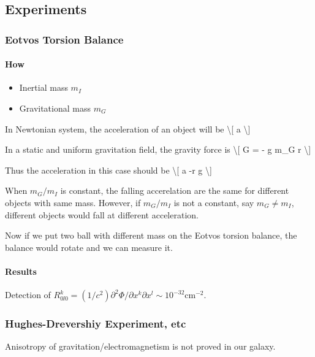 \documentclass[letterpaper,10pt,english]{sphinxmanual}
\begin{document}
\subsection{Experiments}
\label{relativity/GeneralRelativityAdv:experiments}

\subsubsection{Eotvos Torsion Balance}
\label{relativity/GeneralRelativityAdv:eotvos-torsion-balance}

\paragraph{How}
\label{relativity/GeneralRelativityAdv:how}\begin{itemize}
\item {} 
Inertial mass $m_I$

\item {} 
Gravitational mass $m_G$

\end{itemize}

In Newtonian system, the acceleration of an object will be \textbackslash{}{[} a \textbackslash{}{]}

In a static and uniform gravitation field, the gravity force is \textbackslash{}{[} G =
- g m\_G r \textbackslash{}{]}

Thus the acceleration in this case should be \textbackslash{}{[} a -r g \textbackslash{}{]}

When $m_G/m_I$ is constant, the falling accerelation are the same
for different objects with same mass. However, if $m_G/m_I$ is not
a constant, say $m_G\ne m_I$, different objects would fall at
different acceleration.

Now if we put two ball with different mass on the Eotvos torsion
balance, the balance would rotate and we can measure it.


\paragraph{Results}
\label{relativity/GeneralRelativityAdv:results}
Detection of
$R^k_{0l0}=(1/c^2)\partial^2\Phi/\partial x^k\partial x^l \sim 10^{-32} \text{cm}^{-2}$.


\subsubsection{Hughes-Drevershiy Experiment, etc}
\label{relativity/GeneralRelativityAdv:hughes-drevershiy-experiment-etc}
Anisotropy of gravitation/electromagnetism is not proved in our galaxy.
\end{document}

